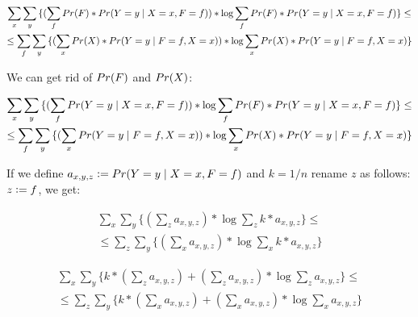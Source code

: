 


\begin{gather*}
\sum_{x}{\sum_{y}{\{ (\sum_{f}{\prob{F}*\prob{Y=y}[X=x, F=f]}) * \log{\sum_{f}{\prob{F}*\prob{Y=y}[X=x, F=f]}} \}}} \leq \\
\leq \sum_{f}{\sum_{y}{\{ (\sum_{x}{\prob{X}*\prob{Y=y}[F=f, X=x]}) * \log{\sum_{x}{\prob{X}*\prob{Y=y}[F=f, X=x]}} \}}} 
\end{gather*}

We can get rid of $\prob{F}$ and $\prob{X}$:

\begin{gather*}
\sum_{x}{\sum_{y}{\{ (\sum_{f}{\prob{Y=y}[X=x, F=f]}) * \log{\sum_{f}{\prob{F}*\prob{Y=y}[X=x, F=f]}} \}}} \leq \\
\leq \sum_{f}{\sum_{y}{\{ (\sum_{x}{\prob{Y=y}[F=f, X=x]}) * \log{\sum_{x}{\prob{X}*\prob{Y=y}[F=f, X=x]}} \}}} 
\end{gather*}

If we define $a_{x,y,z} \defeq \prob{Y=y}[X=x, F=f]$ and $k=1/n$ rename $z$ as follows: $z \vcentcolon= f$, we get:

\begin{gather*}
\sum_{x}{\sum_{y}{\{ (\sum_{z}{a_{x,y,z}}) * \log{\sum_{z}{k*a_{x,y,z}}} \}}} \leq \\
\leq \sum_{z}{\sum_{y}{\{ (\sum_{x}{a_{x,y,z}}) * \log{\sum_{x}{k*a_{x,y,z}}} \}}} 
\end{gather*}

\begin{gather*}
\sum_{x}{\sum_{y}{\{ k*(\sum_{z}{a_{x,y,z}}) + (\sum_{z}{a_{x,y,z}}) * \log{\sum_{z}{a_{x,y,z}}} \}}} \leq \\
\leq \sum_{z}{\sum_{y}{\{ k*(\sum_{x}{a_{x,y,z}}) + (\sum_{x}{a_{x,y,z}}) * \log{\sum_{x}{a_{x,y,z}}} \}}} 
\end{gather*}

